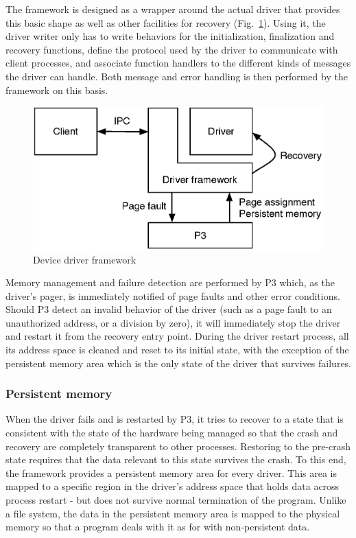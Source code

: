 \documentclass[times, 10pt, twocolumn]{article}
\begin{document}
The framework is designed as a wrapper around the actual driver that provides this basic shape as well as other facilities for recovery (Fig.~\ref{fig:fw}). Using it, the driver writer only has to write behaviors for the initialization, finalization and recovery functions, define the protocol used by the driver to communicate with client processes, and associate function handlers to the different kinds of messages the driver can handle. Both message and error handling is then performed by the framework on this basis.

\begin{figure}[ht]
\centering
\includegraphics[scale=0.5]{figures/framework}
\caption{Device driver framework}
\label{fig:fw}
\end{figure}

Memory management and failure detection are performed by P3 which, as the driver's pager, is immediately notified of page faults and other error conditions. Should P3 detect an invalid behavior of the driver (such as a page fault to an unauthorized address, or a division by zero), it will immediately stop the driver and restart it from the recovery entry point. During the driver restart process, all its address space is cleaned and reset to its initial state, with the exception of the persistent memory area which is the only state of the driver that survives failures.


\subsubsection{Persistent memory}

When the driver fails and is restarted by P3, it tries to recover to a state that is consistent with the state of the hardware being managed so that the crash and recovery are completely transparent to other processes. Restoring to the pre-crash state requires that the data relevant to this state survives the crash. To this end, the framework provides a persistent memory area for every driver.  This area is mapped to a specific region in the driver's address space that holds data across process restart - but does not survive normal termination of the program.  Unlike a file system, the data in the persistent memory area is mapped to the physical memory so that a program deals with it as for with non-persistent data.
\end{document}
